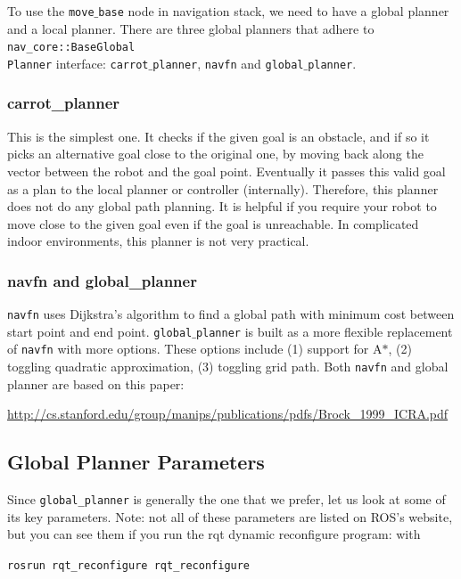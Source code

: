 \documentclass[12pt]{article}
\begin{document}
To use the \texttt{move$\_$base} node in navigation stack, we need to have a global planner
and a local planner. There are three global planners that adhere to \texttt{nav\_core::BaseGlobal\\Planner} interface: \texttt{carrot$\_$planner},
\texttt{navfn} and \texttt{global$\_$planner}.

\subsubsection{carrot\_planner}

This is the simplest one. It checks if the given goal is an obstacle, and if so it picks an alternative goal close to the original one, by moving back along the vector between the robot and the goal point. Eventually it passes this valid goal as a plan to the local planner or controller (internally). Therefore, this planner does not do any global path planning. It is helpful if you require your robot to move close to the given goal even if the goal is unreachable. In complicated indoor environments, this planner is not very practical.

\subsubsection{navfn and global\_planner}

\texttt{navfn} uses Dijkstra's algorithm to find a global path with minimum cost between start point and
end point. \texttt{global$\_$planner} is built as a more flexible replacement of \texttt{navfn} with more options. These
options include (1) support for A$*$, (2) toggling quadratic approximation, (3) toggling grid path. Both \texttt{navfn} and
global planner are based on this paper:

\footnotesize{\url{http://cs.stanford.edu/group/manips/publications/pdfs/Brock_1999_ICRA.pdf}}

\subsection{Global Planner Parameters}
\normalsize

Since \texttt{global\_planner} is generally the one that we prefer, let us look at some of its key parameters.
Note: not all of these parameters are listed on ROS's website, but you can see them if you run the rqt dynamic reconfigure program: with \begin{center}
\texttt{rosrun rqt\_reconfigure rqt\_reconfigure}
\end{center}
\end{document}
